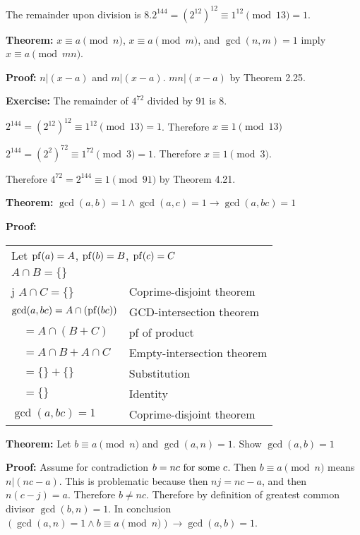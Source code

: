 The remainder upon division is 8.\(2^{144} = (2^{12})^{12} \equiv 1^{12} \pmod 13 = 1\).

\item \textbf{Theorem:} \(x \equiv a \pmod n\), \(x \equiv a \pmod m\), and \(\gcd(n, m) = 1\) imply \(x \equiv a \pmod {mn}\).

\textbf{Proof:} \(n|(x-a)\) and \(m|(x-a)\). \(mn|(x-a)\) by Theorem 2.25. \qedhere

\item \textbf{Exercise:} The remainder of \(4^{72}\) divided by \(91\) is 8.

\(2^{144} = (2^{12})^{12} \equiv 1^{12} \pmod {13} = 1\). Therefore \(x \equiv 1 \pmod {13}\)

\(2^{144} = (2^{2})^{72} \equiv 1^{72} \pmod 3 = 1\). Therefore \(x \equiv 1 \pmod 3\).

Therefore \(4^{72} = 2^{144} \equiv 1 \pmod {91}\) by Theorem 4.21.

\setcounter{enumii}{27}

\item \textbf{Theorem:} \(\gcd(a, b) = 1 \wedge \gcd(a, c) = 1 \rightarrow \gcd(a, bc) = 1\)

\textbf{Proof:}

\begin{tabular}[t]{ll}
\multicolumn{2}{l}{Let \(\operatorname{pf}(a) = A\), \(\operatorname{pf}(b) = B\), \(\operatorname{pf}(c) = C\)} \\
\(A \cap B = \{\}\) \\ j 
\(A \cap C = \{\}\) & Coprime-disjoint theorem \\
\(\gcd(a, bc) = A \cap (\operatorname{pf}(bc))\) & GCD-intersection theorem \\
\(\quad = A \cap (B + C)\) & pf of product \\
\(\quad = A \cap B + A \cap C\) & Empty-intersection theorem \\
\(\quad = \{\} + \{\}\) & Substitution \\
\(\quad = \{\}\) & Identity \\
\(\gcd(a, bc) = 1\) & Coprime-disjoint theorem \qedhere
\end{tabular}

\item \textbf{Theorem:} Let \(b \equiv a \pmod n\) and \(\gcd(a, n) = 1\). Show \(\gcd(a, b) = 1\)

\textbf{Proof:} Assume for contradiction \(b = n c \textrm{\ for some\ } c\). Then \(b \equiv a \pmod n\) means \(n | (nc - a)\). This is problematic because then \(nj = nc - a\), and then \(n(c-j) = a\). Therefore \(b \neq nc\). Therefore by definition of greatest common divisor \(\gcd(b, n) = 1\). In conclusion \((\gcd(a, n) = 1 \wedge b \equiv a \pmod n) \rightarrow \gcd(a, b) = 1\). \qedhere

